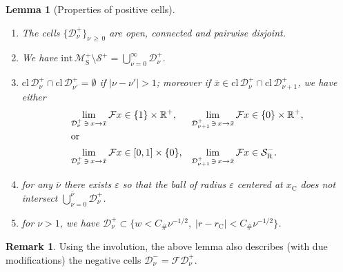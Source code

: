 \documentclass[10pt]{amsart}
\newtheorem{lemm}[theo]{Lemma}\newtheorem{prop}[theo]{Proposition}\newtheorem{coro}[theo]{Corollary}\newtheorem{conj}[theo]{Conjecture}
\theoremstyle{definition}\newtheorem{defi}[theo]{Definition}\newtheorem{rema}[theo]{Remark}\newtheorem{exam}[theo]{Example}\newtheorem{exem}[theo]{Example}\newtheorem{nota}[theo]{Notation}
\newcommand{\eps}{\varepsilon}
\newcommand{\ct}{r}
\newcommand{\intr}[1]{\mathrm{int}\,#1}
\newcommand{\crit}{\mathrm{C}}
\newcommand{\ctc}{\ct_\crit}
\newcommand{\xc}{x_\crit}
\newcommand{\reals}{\mathbb{R}}
\newcommand{\cm}{\mathcal{F}}
\newcommand{\cell}{\mathcal{D}}
\newcommand{\csp}{\mathcal{M}}
\newcommand{\csps}{\csp_\text{S}}
\newcommand{\recoPrivate}{\mathrm{R}}
\newcommand{\singPrivate}{\mathcal{S}}
\newcommand{\singReco}{\singPrivate_{\recoPrivate}}
\newcommand{\singForward}[1]{\singPrivate^+_{#1}}
\newcommand{\indCell}{\nu}
\newcommand{\Const}{C_\#}
\newcommand{\clo}{\text{cl}\,}
\newcommand*\DS{\displaystyle}
\newcommand*{\relabel}{\renewcommand{\labelenumi}{(\theenumi)}}
\newcommand*{\alphenumi}{\renewcommand*{\theenumi}{\alph{enumi}}\relabel}
\begin{document}
\begin{lemm}[Properties of positive cells]\label{l_singularityStructure}
\leavevmode
\begin{enumerate}\alphenumi
\item \label{i_disjointCells}
The cells $\{\cell^+_\indCell\}_{\indCell\,\ge\,0}$ are open, connected and pairwise disjoint.
\item \label{i_partitionCells}
We have $\DS
\intr\csps^+\setminus\singForward{}=\bigcup_{\indCell=0}^\infty\cell^+_\indCell. $
\item \label{i_adjacentCells}
$\clo\cell^+_\indCell\cap\clo \cell^+_{\indCell'} = \emptyset$ if $|\indCell-\indCell'| > 1$; moreover if $\bar x\in\clo\cell^{+}_{\indCell}\cap\clo\cell^{+}_{\indCell+1}$, we have either
\begin{align*}
\lim_{\cell^{+}_{\indCell}\,\ni\,x\to\bar x}\cm x&\in\{1\}\times\reals^+,&
\lim_{\cell^{+}_{\indCell+1}\,\ni\,x\to\bar x}\cm x&\in\{0\}\times\reals^+,
\\
\intertext{or}
\lim_{\cell^{+}_{\indCell}\,\ni\,x\to\bar x}\cm x&\in[0,1]\times\{0\},&
\lim_{\cell^{+}_{\indCell+1}\,\ni\,x\to\bar x}\cm x&\in\singReco^{-}.
\end{align*}
\item for any $\bar\indCell$ there exists $\eps$ so that the ball of radius $\eps$ centered at $\xc$ does not intersect $\bigcup_{\indCell = 0}^{\bar\indCell} \cell^+_\indCell$.
\item \label{i_boundedCells}
for $\indCell > 1$, we have $\cell^{+}_{\indCell}\subset\{w < \Const \indCell^{-1/2},\; |\ct-\ctc|< \Const \indCell^{-1/2} \}$.
\end{enumerate}
\end{lemm}

\begin{rema}\label{r_singularityStructureBackwards}
Using the involution, the above lemma also describes (with due modifications) the negative cells $\cell^-_\indCell = \cm\cell^+_\indCell$.
\end{rema}
\end{document}
